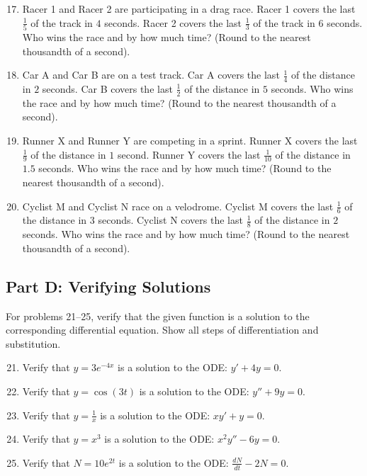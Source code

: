 \documentclass{article}
\begin{document}
\begin{enumerate}
    \setcounter{enumi}{16}
    \item Racer 1 and Racer 2 are participating in a drag race. Racer 1 covers the last $\frac{1}{5}$ of the track in $4$ seconds. Racer 2 covers the last $\frac{1}{3}$ of the track in $6$ seconds. Who wins the race and by how much time? (Round to the nearest thousandth of a second).
    \item Car A and Car B are on a test track. Car A covers the last $\frac{1}{4}$ of the distance in $2$ seconds. Car B covers the last $\frac{1}{2}$ of the distance in $5$ seconds. Who wins the race and by how much time? (Round to the nearest thousandth of a second).
    \item Runner X and Runner Y are competing in a sprint. Runner X covers the last $\frac{1}{9}$ of the distance in $1$ second. Runner Y covers the last $\frac{1}{10}$ of the distance in $1.5$ seconds. Who wins the race and by how much time? (Round to the nearest thousandth of a second).
    \item Cyclist M and Cyclist N race on a velodrome. Cyclist M covers the last $\frac{1}{6}$ of the distance in $3$ seconds. Cyclist N covers the last $\frac{1}{8}$ of the distance in $2$ seconds. Who wins the race and by how much time? (Round to the nearest thousandth of a second).
\end{enumerate}

\subsection*{Part D: Verifying Solutions}
For problems 21--25, verify that the given function is a solution to the corresponding differential equation. Show all steps of differentiation and substitution.

\begin{enumerate}
    \setcounter{enumi}{20}
    \item Verify that $y = 3e^{-4x}$ is a solution to the ODE: $y' + 4y = 0$.
    \item Verify that $y = \cos(3t)$ is a solution to the ODE: $y'' + 9y = 0$.
    \item Verify that $y = \frac{1}{x}$ is a solution to the ODE: $x y' + y = 0$.
    \item Verify that $y = x^3$ is a solution to the ODE: $x^2 y'' - 6y = 0$.
    \item Verify that $N = 10e^{2t}$ is a solution to the ODE: $\frac{dN}{dt} - 2N = 0$.
\end{enumerate}
\end{document}
